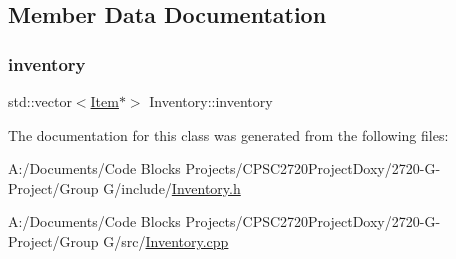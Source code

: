 \subsection{Member Data Documentation}
\mbox{\label{class_inventory_a34fed530d676159a14178b36ce9981ca}} 
\subsubsection{\texorpdfstring{inventory}{inventory}}
{\footnotesize\ttfamily std\+::vector$<$\mbox{\hyperlink{class_item}{Item}}$\ast$$>$ Inventory\+::inventory}



The documentation for this class was generated from the following files\+:\begin{DoxyCompactItemize}
\item 
A\+:/\+Documents/\+Code Blocks Projects/\+C\+P\+S\+C2720\+Project\+Doxy/2720-\/\+G-\/\+Project/\+Group G/include/\mbox{\hyperlink{_inventory_8h}{Inventory.\+h}}\item 
A\+:/\+Documents/\+Code Blocks Projects/\+C\+P\+S\+C2720\+Project\+Doxy/2720-\/\+G-\/\+Project/\+Group G/src/\mbox{\hyperlink{_inventory_8cpp}{Inventory.\+cpp}}\end{DoxyCompactItemize}
